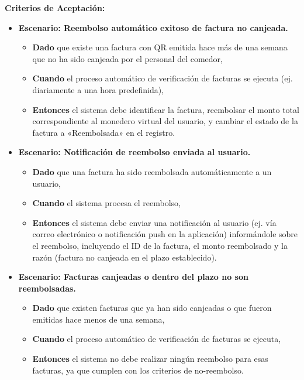 \documentclass[12pt]{article}
\begin{document}
\textbf{Criterios de Aceptación:}
\begin{itemize}
	\item \textbf{Escenario: Reembolso automático exitoso de factura no canjeada.}
	\begin{itemize}
		\item \textbf{Dado} que existe una factura con QR emitida hace más de una semana que no ha sido canjeada por el personal del comedor,
		\item \textbf{Cuando} el proceso automático de verificación de facturas se ejecuta (ej. diariamente a una hora predefinida),
		\item \textbf{Entonces} el sistema debe identificar la factura, reembolsar el monto total correspondiente al monedero virtual del usuario, y cambiar el estado de la factura a «Reembolsada» en el registro.
	\end{itemize}

	\item \textbf{Escenario: Notificación de reembolso enviada al usuario.}
	\begin{itemize}
		\item \textbf{Dado} que una factura ha sido reembolsada automáticamente a un usuario,
		\item \textbf{Cuando} el sistema procesa el reembolso,
		\item \textbf{Entonces} el sistema debe enviar una notificación al usuario (ej. vía correo electrónico o notificación push en la aplicación) informándole sobre el reembolso, incluyendo el ID de la factura, el monto reembolsado y la razón (factura no canjeada en el plazo establecido).
	\end{itemize}

	\item \textbf{Escenario: Facturas canjeadas o dentro del plazo no son reembolsadas.}
	\begin{itemize}
		\item \textbf{Dado} que existen facturas que ya han sido canjeadas o que fueron emitidas hace menos de una semana,
		\item \textbf{Cuando} el proceso automático de verificación de facturas se ejecuta,
		\item \textbf{Entonces} el sistema no debe realizar ningún reembolso para esas facturas, ya que cumplen con los criterios de no-reembolso.
	\end{itemize}


\end{itemize}
\end{document}
